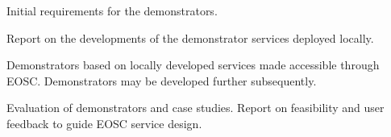 \begin{workpackage}
\begin{wpdescription}
\end{wpdescription}

\begin{tasklist}
% 








\end{tasklist}



\begin{wpdelivs}

  \begin{wpdeliv}[due=12,miles=startup,id=codesign-support,dissem=PU,nature=R,lead=SRL]
    {Initial requirements for the demonstrators.}
  \end{wpdeliv}

  \begin{wpdeliv}[due=24,miles=prototype,id=local-services,dissem=PU,nature=R,lead=EP]
    {Report on the developments of the demonstrator services deployed locally.}
  \end{wpdeliv}

  \begin{wpdeliv}[due=36,miles=community,id=demonstrators,dissem=PU,nature=DEM,lead=EGI]
    {Demonstrators based on locally developed services made accessible
      through EOSC. Demonstrators may be developed further subsequently.}
  \end{wpdeliv}

  \begin{wpdeliv}[due=48,miles=final,id=applications-report,dissem=PU,nature=R,lead=XFEL]
    {Evaluation of demonstrators and case studies. Report on
      feasibility and user feedback to guide EOSC service design.}
  \end{wpdeliv}

\end{wpdelivs}
\end{workpackage}

